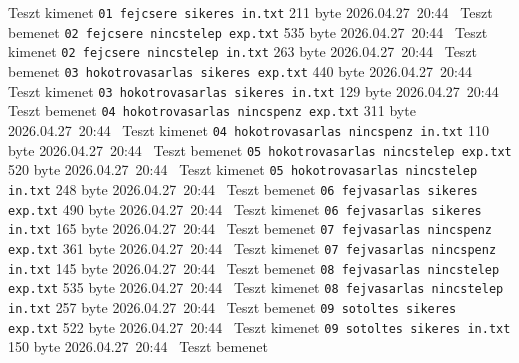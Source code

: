 \begin{fajllista}
    {Teszt kimenet} %
    \fajl
    {\texttt{01 fejcsere sikeres in.txt}} %
    {211 byte} %
    {2026.04.27~20:44~} %
    {Teszt bemenet} %
    \fajl
    {\texttt{02 fejcsere nincstelep exp.txt}} %
    {535 byte} %
    {2026.04.27~20:44~} %
    {Teszt kimenet} %
    \fajl
    {\texttt{02 fejcsere nincstelep in.txt}} %
    {263 byte} %
    {2026.04.27~20:44~} %
    {Teszt bemenet} %
    \fajl
    {\texttt{03 hokotrovasarlas sikeres exp.txt}} %
    {440 byte} %
    {2026.04.27~20:44~} %
    {Teszt kimenet} %
    \fajl
    {\texttt{03 hokotrovasarlas sikeres in.txt}} %
    {129 byte} %
    {2026.04.27~20:44~} %
    {Teszt bemenet} %
    \fajl
    {\texttt{04 hokotrovasarlas nincspenz exp.txt}} %
    {311 byte} %
    {2026.04.27~20:44~} %
    {Teszt kimenet} %
    \fajl
    {\texttt{04 hokotrovasarlas nincspenz in.txt}} %
    {110 byte} %
    {2026.04.27~20:44~} %
    {Teszt bemenet} %
    \fajl
    {\texttt{05 hokotrovasarlas nincstelep exp.txt}} %
    {520 byte} %
    {2026.04.27~20:44~} %
    {Teszt kimenet} %
    \fajl
    {\texttt{05 hokotrovasarlas nincstelep in.txt}} %
    {248 byte} %
    {2026.04.27~20:44~} %
    {Teszt bemenet} %
    \fajl
    {\texttt{06 fejvasarlas sikeres exp.txt}} %
    {490 byte} %
    {2026.04.27~20:44~} %
    {Teszt kimenet} %
    \fajl
    {\texttt{06 fejvasarlas sikeres in.txt}} %
    {165 byte} %
    {2026.04.27~20:44~} %
    {Teszt bemenet} %
    \fajl
    {\texttt{07 fejvasarlas nincspenz exp.txt}} %
    {361 byte} %
    {2026.04.27~20:44~} %
    {Teszt kimenet} %
    \fajl
    {\texttt{07 fejvasarlas nincspenz in.txt}} %
    {145 byte} %
    {2026.04.27~20:44~} %
    {Teszt bemenet} %
    \fajl
    {\texttt{08 fejvasarlas nincstelep exp.txt}} %
    {535 byte} %
    {2026.04.27~20:44~} %
    {Teszt kimenet} %
    \fajl
    {\texttt{08 fejvasarlas nincstelep in.txt}} %
    {257 byte} %
    {2026.04.27~20:44~} %
    {Teszt bemenet} %
    \fajl
    {\texttt{09 sotoltes sikeres exp.txt}} %
    {522 byte} %
    {2026.04.27~20:44~} %
    {Teszt kimenet} %
    \fajl
    {\texttt{09 sotoltes sikeres in.txt}} %
    {150 byte} %
    {2026.04.27~20:44~} %
    {Teszt bemenet} %

\end{fajllista}

